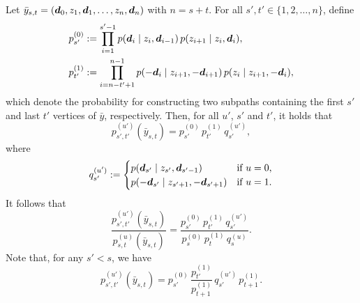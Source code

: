 \documentclass[11pt]{article}
\begin{document}
%
Let $\bar{y}_{s,t} = (\bm{d}_0, z_1, \bm{d}_1, \ldots, z_n, \bm{d}_n)$ with $n = s + t$.
For all $s', t' \in \{ 1, 2, \ldots, n \}$, define
%
\begin{align}
p^{(0)}_{s'} &:= \prod_{i = 1}^{s' - 1} p( \bm{d}_i \;|\; z_i, \bm{d}_{i - 1} ) \, p( z_{i + 1} \;|\; z_i, \bm{d}_i ),\\
p^{(1)}_{t'} &:= \prod_{i = n - t' + 1}^{n - 1} p( -\bm{d}_i \;|\; z_{i + 1}, -\bm{d}_{i + 1} ) \, p( z_i \;|\; z_{i + 1}, -\bm{d}_i ),
\end{align}
%
which denote the probability for constructing two subpaths containing the first $s'$ and last $t'$ vertices of $\bar{y}$, respectively.
Then, for all $u'$, $s'$ and $t'$, it holds that
%
\begin{equation}
p^{(u')}_{s',t'}(\bar{y}_{s,t}) = p^{(0)}_{s'} \, p^{(1)}_{t'} \, q^{(u')}_{s'},
\end{equation}
%
where
%
\begin{equation}
q^{(u')}_{s'} := \begin{cases}
p( \bm{d}_{s'} \;|\; z_{s'}, \bm{d}_{s' - 1} ) & \text{if $u = 0$,}\\
p( -\bm{d}_{s'} \;|\; z_{s' + 1}, -\bm{d}_{s' + 1} ) & \text{if $u = 1$.}
\end{cases}
\end{equation}
%
It follows that
%
\begin{equation}
\label{eqn:bdpt_pdf_ratio_0}
\frac{p^{(u')}_{s', t'}(\bar{y}_{s,t})}{p^{(u)}_{s,t}(\bar{y}_{s,t})}
= \frac{p^{(0)}_{s'} \, p^{(1)}_{t'} \, q^{(u')}_{s'}}{p^{(0)}_s \, p^{(1)}_t \, q^{(u)}_s}.
\end{equation}
%
Note that, for any $s' < s$, we have
%
\begin{equation}
p^{(u')}_{s', t'}(\bar{y}_{s,t}) = p^{(0)}_{s'} \, \frac{p^{(1)}_{t'}}{p^{(1)}_{t + 1}} \, q^{(u')}_{s'} \,p^{(1)}_{t + 1}.
\end{equation}
\end{document}
